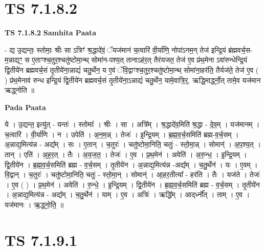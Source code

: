 \documentclass[17pt]{extarticle}
\begin{document}
\section*{ TS 7.1.8.2 }

\textbf{TS 7.1.8.2 } \newline
\textbf{Samhita Paata} \newline

- द्य उ॒द्यन्तः॒ स्तोमाः॒ श्रीः सा ऽत्रिꣳ॑ श्र॒द्धादे॑वं॒ ॅयज॑मानं च॒त्वारि॑ वी॒र्या॑णि॒ नोपा॑ऽनम॒न् तेज॑ इन्द्रि॒यं ब्र॑ह्मवर्च॒स-म॒न्नाद्यꣳ॒॒ स ए॒ताꣳश्च॒तुर॒श्चतु॑ष्टोमा॒न्थ् सोमा॑न-पश्य॒त् तानाऽह॑र॒त् तैर॑यजत॒ तेज॑ ए॒व प्र॑थ॒मेना ऽवा॑रुन्धेन्द्रि॒यं द्वि॒तीये॑न ब्रह्मवर्च॒सं तृ॒तीये॑ना॒न्नाद्यं॑ चतु॒र्थेन॒ य ए॒वं ॅवि॒द्वाꣳश्च॒तुर॒श्चतु॑ष्टोमा॒न्थ् सोमा॑ना॒हर॑ति॒ तैर्यज॑ते॒ तेज॑ ए॒व ( ) प्र॑थ॒मेनाव॑ रुन्ध इन्द्रि॒यं द्वि॒तीये॑न ब्रह्मवर्च॒सं तृ॒तीये॑ना॒ऽन्नाद्यं॑ चतु॒र्थेन॒ यामे॒वात्रि॒र्॒. ऋद्धि॒मार्द्ध्नो॒त् तामे॒व यज॑मान ऋद्ध्नोति ॥ \newline

\textbf{Pada Paata} \newline

ये । उ॒द्यन्त॒ इत्यु॑त् - यन्तः॑ । स्तोमाः᳚ । श्रीः । सा । अत्रि᳚म् । श्र॒द्धादे॑व॒मिति॑ श्र॒द्धा - दे॒व॒म् । यज॑मानम् । च॒त्वारि॑ । वी॒र्या॑णि । न । उपेति॑ । अ॒न॒म॒न्न् । तेजः॑ । इ॒न्द्रि॒यम् । ब्र॒ह्म॒व॒र्च॒समिति॑ ब्रह्म-व॒र्च॒सम् । अ॒न्नाद्य॒मित्य॑न्न - अद्य᳚म् । सः । ए॒तान् । च॒तुरः॑ । चतु॑ष्टोमा॒निति॒ चतुः॑ - स्तो॒मा॒न्न् । सोमान्॑ । अ॒प॒श्य॒त् । तान् । एति॑ । अ॒ह॒र॒त् । तैः । अ॒य॒ज॒त॒ । तेजः॑ । ए॒व । प्र॒थ॒मेन॑ । अवेति॑ । अ॒रु॒न्ध॒ । इ॒न्द्रि॒यम् । द्वि॒तीये॑न । ब्र॒ह्म॒व॒र्च॒समिति॑ ब्रह्म - व॒र्च॒सम् । तृ॒तीये॑न । अ॒न्नाद्य॒मित्य॑न्न -अद्य᳚म् । च॒तु॒र्थेन॑ । यः । ए॒वम् । वि॒द्वान् । च॒तुरः॑ । चतु॑ष्टोमा॒निति॒ चतुः॑ - स्तो॒मा॒न् । सोमान्॑ । आ॒हर॒तीत्या᳚ - हर॑ति । तैः । यज॑ते । तेजः॑ । ए॒व ( ) । प्र॒थ॒मेन॑ । अवेति॑ । रु॒न्धे॒ । इ॒न्द्रि॒यम् । द्वि॒तीये॑न । ब्र॒ह्म॒व॒र्च॒समिति॑ ब्रह्म - व॒र्च॒सम् । तृ॒तीये॑न । अ॒न्नाद्य॒मित्य॑न्न - अद्य᳚म् । च॒तु॒र्थेन॑ । याम् । ए॒व । अत्रिः॑ । ऋद्धि᳚म् । आद्‌र्ध्नो᳚त् । ताम् । ए॒व । यज॑मानः । ऋ॒द्ध्नो॒ति॒ ॥  \newline




\section*{ TS 7.1.9.1 }
\end{document}
